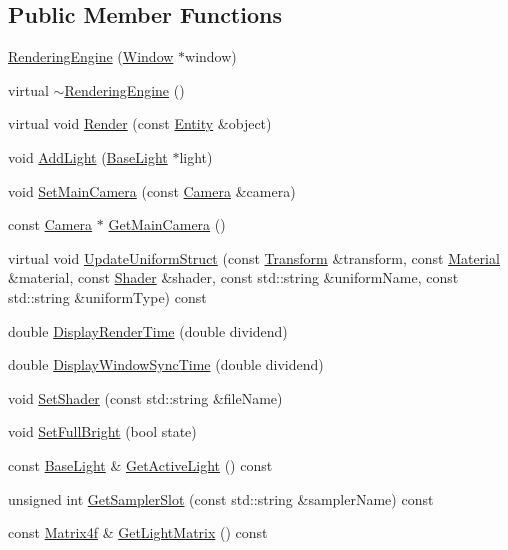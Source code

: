 \subsection*{Public Member Functions}
\begin{DoxyCompactItemize}
\item 
\hyperlink{class_rendering_engine_a0e21c88e8062f84c4ac72eaeee7589b7}{Rendering\+Engine} (\hyperlink{class_window}{Window} $\ast$window)
\item 
virtual \hyperlink{class_rendering_engine_a88d03066dde2aff01969125ec4cad81d}{$\sim$\+Rendering\+Engine} ()
\item 
virtual void \hyperlink{class_rendering_engine_a38ac5d7f0ed4b4933c232ca00a3adde5}{Render} (const \hyperlink{class_entity}{Entity} \&object)
\item 
void \hyperlink{class_rendering_engine_abdb38492f5b6ce91faf67be45a4f8398}{Add\+Light} (\hyperlink{lighting_8h_a5796f1b946d6b585e607c4d0df3a0d8f}{Base\+Light} $\ast$light)
\item 
void \hyperlink{class_rendering_engine_ab4129c1f16613cf99a42af5e9a25a94d}{Set\+Main\+Camera} (const \hyperlink{class_camera}{Camera} \&camera)
\item 
const \hyperlink{class_camera}{Camera} $\ast$ \hyperlink{class_rendering_engine_a82df5730a81c8dcc7396db4faea0475b}{Get\+Main\+Camera} ()
\item 
virtual void \hyperlink{class_rendering_engine_ad585884dd7d40bc347b729985edd214e}{Update\+Uniform\+Struct} (const \hyperlink{class_transform}{Transform} \&transform, const \hyperlink{class_material}{Material} \&material, const \hyperlink{class_shader}{Shader} \&shader, const std\+::string \&uniform\+Name, const std\+::string \&uniform\+Type) const 
\item 
double \hyperlink{class_rendering_engine_a9207fd39818ffb3522e5450cd5303b15}{Display\+Render\+Time} (double dividend)
\item 
double \hyperlink{class_rendering_engine_a552848b25ff08e2c6961570504291eaa}{Display\+Window\+Sync\+Time} (double dividend)
\item 
void \hyperlink{class_rendering_engine_ac7087d3f4ace79e7c1671549959c3bcd}{Set\+Shader} (const std\+::string \&file\+Name)
\item 
void \hyperlink{class_rendering_engine_ab00fce20ca35e752481114e05ef1eab1}{Set\+Full\+Bright} (bool state)
\item 
const \hyperlink{lighting_8h_a5796f1b946d6b585e607c4d0df3a0d8f}{Base\+Light} \& \hyperlink{class_rendering_engine_a8fcd0abd0d6d85938daab3e2a53586c3}{Get\+Active\+Light} () const 
\item 
unsigned int \hyperlink{class_rendering_engine_a61b5cf1c219f9a2514e9c44818dd25a8}{Get\+Sampler\+Slot} (const std\+::string \&sampler\+Name) const 
\item 
const \hyperlink{math3d_8h_a5b7721ab7216c91a40538beaa9e6ee1f}{Matrix4f} \& \hyperlink{class_rendering_engine_a0765f39bf7970cb6cb9f2de446f86671}{Get\+Light\+Matrix} () const 
\end{DoxyCompactItemize}
